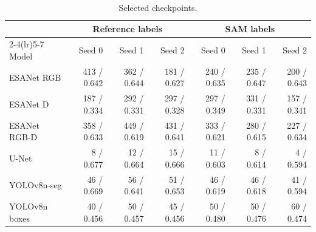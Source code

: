 \begin{table}[H]
\caption{Selected checkpoints.}\label{tab:checkpoints}
\centering\footnotesize
\setlength{\tabcolsep}{5pt}
\begin{tabular}{lrrrrrr}
\toprule
 & \multicolumn{3}{c}{Reference labels} & \multicolumn{3}{c}{SAM labels}\\
\cmidrule(lr){2-4}\cmidrule(lr){5-7}
Model & Seed 0 & Seed 1 & Seed 2 & Seed 0 & Seed 1 & Seed 2\\\midrule
ESANet RGB & 413 / 0.642 & 362 / 0.644 & 181 / 0.627 & 240 / 0.635 & 235 / 0.647 & 200 / 0.643\\
ESANet D & 187 / 0.334 & 292 / 0.331 & 297 / 0.328 & 297 / 0.349 & 331 / 0.331 & 157 / 0.341\\
ESANet RGB-D & 358 / 0.633 & 449 / 0.619 & 431 / 0.641 & 333 / 0.621 & 280 / 0.615 & 227 / 0.634\\
U-Net & 8 / 0.677 & 12 / 0.664 & 15 / 0.666 & 11 / 0.603 & 8 / 0.614 & 4 / 0.594\\
YOLOv8n-seg & 46 / 0.669 & 56 / 0.641 & 51 / 0.653 & 46 / 0.619 & 46 / 0.618 & 41 / 0.594\\
YOLOv8n boxes & 40 / 0.456 & 50 / 0.457 & 45 / 0.456 & 50 / 0.480 & 50 / 0.476 & 60 / 0.474\\
\bottomrule\end{tabular}
\par{}
\end{table}
